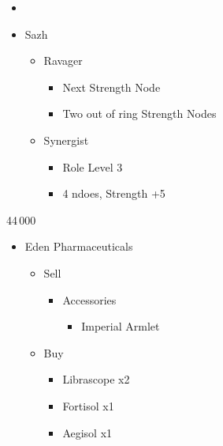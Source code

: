 \documentclass{report}
\begin{document}
\begin{menu}
\begin{itemize}
    \paradigm
    \begin{itemize}
        \item {}%
{\paradigmline{\com}{\com}{\med}}%
{\paradigmline{\textit{\com}}{\textit{\com}}{\textit{(\rav)}}}%
{\paradigmline{(\sen)}{(\sen)}{\med}}%
{\paradigmline{(\syn)}{\rav}{\rav}}%
{\paradigmline{\sab}{\rav}{\rav}}%
{\paradigmline{\rav}{\rav}{\rav}}
    \end{itemize}
    \crystarium
    \begin{itemize}
        \item Sazh
        \begin{itemize}
            \item Ravager
            \begin{itemize}
                \item Next Strength Node
                \item Two out of ring Strength Nodes
            \end{itemize}
            \item Synergist
            \begin{itemize}
                \item Role Level 3
                \item 4 ndoes, Strength +5
            \end{itemize}
        \end{itemize}
    \end{itemize}
\end{itemize}
\end{menu}
\begin{shop}{44\,000}
\begin{itemize}
    \item Eden Pharmaceuticals
    \begin{itemize}
        \item Sell
        \begin{itemize}
            \item Accessories
            \begin{itemize}
                \item Imperial Armlet
            \end{itemize}
        \end{itemize}
        \item Buy
        \begin{itemize}
            \item Librascope x2
            \item Fortisol x1
            \item Aegisol x1
        \end{itemize}
    \end{itemize}
\end{itemize}
\end{shop}
\end{document}
